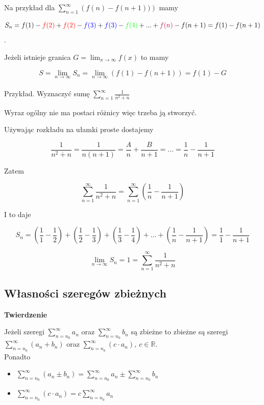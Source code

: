 \documentclass[12pt]{article}
\begin{document}
Na przykład dla $ \sum\limits_{n = 1}^{\infty} \left( f(n) - f(n + 1)) \right) $ mamy

$$ S_n = f(1) - \textcolor{red}{f(2)} + \textcolor{red}{f(2)} - \textcolor{blue}{f(3)} + \textcolor{blue}{f(3)} - 
\textcolor{green}{f(4)} + ... + \textcolor{purple}{f(n)} - f(n + 1) = f(1) - f(n + 1) $$.

Jeżeli istnieje granica $ G = \lim_{x \to \infty} f(x) $ to mamy

$$ S = \lim_{n \to \infty} S_n = \lim_{n \to \infty} \left( f(1) - f(n + 1) \right) = f(1) - G $$ \\

Przykład. Wyznaczyć sumę $ \sum\limits_{n = 1}^{\infty} \frac{1}{n^2 + n} $

Wyraz ogólny nie ma postaci różnicy więc trzeba ją stworzyć.

Używając rozkładu na ułamki proste dostajemy

$$ \frac{1}{n^2 + n} = \frac{1}{n(n+1)} = \frac{A}{n} + \frac{B}{n+1} = ... = \frac{1}{n} - \frac{1}{n+1} $$

Zatem 

$$ \sum\limits_{n = 1}^{\infty} \frac{1}{n^2 + n} = \sum\limits_{n=1}^{\infty} \left( \frac{1}{n} - \frac{1}{n+1} \right) $$

I to daje

$$ S_n = \left( \frac{1}{1} - \frac{1}{2} \right) + \left( \frac{1}{2} - \frac{1}{3} \right) + \left( \frac{1}{3} - \frac{1}{4} \right)
+ ... + \left( \frac{1}{n} - \frac{1}{n+1} \right) = \frac{1}{1} - \frac{1}{n+1}  $$ 

$$ \lim_{n \to \infty} S_n = 1 = \sum\limits_{n = 1}^{\infty} \frac{1}{n^2 + n} $$

\subsection*{Własności szeregów zbieżnych}

\textbf{Twierdzenie}

Jeżeli szeregi $ \sum\limits_{n = n_0}^{\infty} a_n $ oraz $ \sum\limits_{n = n_0}^{\infty} b_n $ są zbieżne to zbieżne są szeregi
$ \sum\limits_{n = n_0}^{\infty} (a_n + b_n) $ \linebreak oraz $ \sum\limits_{n = n_0}^{\infty} (c \cdot a_n), \ c \in \mathbb{R} $. \\

Ponadto

\begin{itemize}
    \item $ \sum\limits_{n = n_0}^{\infty} (a_n \pm b_n) = \sum\limits_{n = n_0}^{\infty} a_n \pm \sum\limits_{n = n_0}^{\infty} b_n $
    \item $ \sum\limits_{n = n_0}^{\infty} (c \cdot a_n) = c \sum\limits_{n = n_0}^{\infty} a_n $ \\
\end{itemize}
\end{document}
